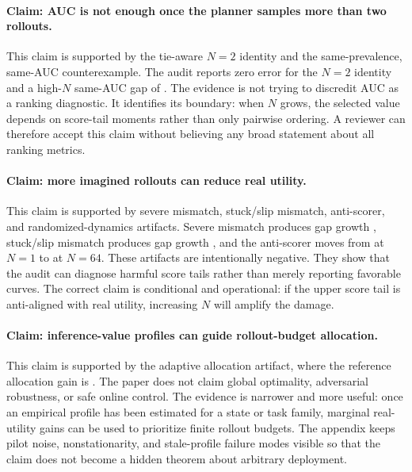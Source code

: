 \paragraph{Claim: AUC is not enough once the planner samples more than two
rollouts.}
This claim is supported by the tie-aware $N=2$ identity and the same-prevalence,
same-AUC counterexample. The audit reports zero error for the $N=2$ identity
and a high-$N$ same-AUC gap of \VFourWAMSameAUCGap{}. The evidence is not
trying to discredit AUC as a ranking diagnostic. It identifies its boundary:
when $N$ grows, the selected value depends on score-tail moments rather than
only pairwise ordering. A reviewer can therefore accept this claim without
believing any broad statement about all ranking metrics.

\paragraph{Claim: more imagined rollouts can reduce real utility.}
This claim is supported by severe mismatch, stuck/slip mismatch, anti-scorer,
and randomized-dynamics artifacts. Severe mismatch produces gap growth
\VFourWAMSevereGapGrowth{}, stuck/slip mismatch produces gap growth
\VFourWAMStuckGapGrowth{}, and the anti-scorer moves from
\VFourWAMAntiScorerNOne{} at $N=1$ to \VFourWAMAntiScorerNSixtyFour{} at
$N=64$. These artifacts are intentionally negative. They show that the audit
can diagnose harmful score tails rather than merely reporting favorable curves.
The correct claim is conditional and operational: if the upper score tail is
anti-aligned with real utility, increasing $N$ will amplify the damage.

\paragraph{Claim: inference-value profiles can guide rollout-budget
allocation.}
This claim is supported by the adaptive allocation artifact, where the
reference allocation gain is \VFourWAMAdaptiveGain{}. The paper does not claim
global optimality, adversarial robustness, or safe online control. The
evidence is narrower and more useful: once an empirical profile has been
estimated for a state or task family, marginal real-utility gains can be used
to prioritize finite rollout budgets. The appendix keeps pilot noise,
nonstationarity, and stale-profile failure modes visible so that the claim does
not become a hidden theorem about arbitrary deployment.

